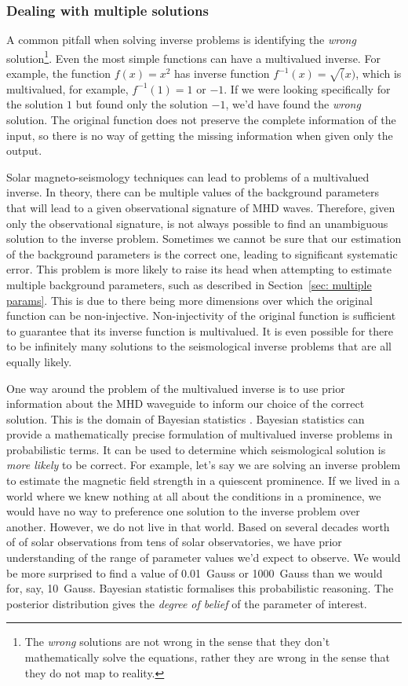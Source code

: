 \documentclass[12pt]{../style-files/ociamthesis}
\begin{document}
\subsubsection{Dealing with multiple solutions} \label{sec: multiple roots}

A common pitfall when solving inverse problems is identifying the \textit{wrong} solution\footnote{The \textit{wrong} solutions are not wrong in the sense that they don't mathematically solve the equations, rather they are wrong in the sense that they do not map to reality.}. Even the most simple functions can have a multivalued inverse. For example, the function $f(x) = x^2$ has inverse function $f^{-1}(x) = \sqrt(x)$, which is multivalued, for example, $f^{-1}(1) = 1$ or $-1$. If we were looking specifically for the solution $1$ but found only the solution $-1$, we'd have found the \textit{wrong} solution. The original function does not preserve the complete information of the input, so there is no way of getting the missing information when given only the output.

Solar magneto-seismology techniques can lead to problems of a multivalued inverse. In theory, there can be multiple values of the background parameters that will lead to a given observational signature of MHD waves. Therefore, given only the observational signature, is not always possible to find an unambiguous solution to the inverse problem. Sometimes we cannot be sure that our estimation of the background parameters is the correct one, leading to significant systematic error. This problem is more likely to raise its head when attempting to estimate multiple background parameters, such as described in Section~\ref{sec: multiple params}. This is due to there being more dimensions over which the original function can be non-injective. Non-injectivity of the original function is sufficient to guarantee that its inverse function is multivalued. It is even possible for there to be infinitely many solutions to the seismological inverse problems that are all equally likely.

One way around the problem of the multivalued inverse is to use prior information about the MHD waveguide to inform our choice of the correct solution. This is the domain of Bayesian statistics \citep{arr_etal11,arr_etal18}. Bayesian statistics can provide a mathematically precise formulation of multivalued inverse problems in probabilistic terms. It can be used to determine which seismological solution is \textit{more likely} to be correct. For example, let's say we are solving an inverse problem to estimate the magnetic field strength in a quiescent prominence. If we lived in a world where we knew nothing at all about the conditions in a prominence, we would have no way to preference one solution to the inverse problem over another. However, we do not live in that world. Based on several decades worth of of solar observations from tens of solar observatories, we have prior understanding of the range of parameter values we'd expect to observe. We would be more surprised to find a value of 0.01~Gauss or 1000~Gauss than we would for, say, 10~Gauss. Bayesian statistic formalises this probabilistic reasoning. The posterior distribution gives the \textit{degree of belief} of the parameter of interest.
\end{document}
